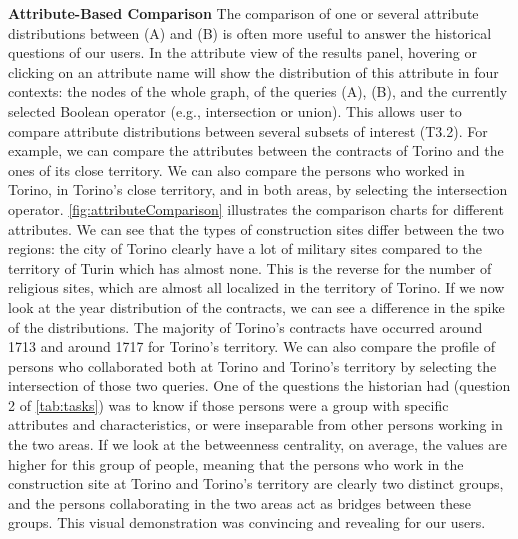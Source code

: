 \iffalse
\begin{figure}
    \centering
    \texttt{[image: Figures/comparisonPlots/graphMeasuresComparison.png]}
    \caption{Comparison table of the graph measures of the query filters (A) and (B)}\label{fig:comparisonTable}
\end{figure}
\fi

\noindent\textbf{Attribute-Based Comparison}
The comparison of one or several attribute distributions between (A) and (B) is often more useful to answer the historical questions of our users. In the attribute view of the results panel, hovering or clicking on an attribute name will show the distribution of this attribute in four contexts: the nodes of the whole graph, of the queries (A), (B), and the currently selected Boolean operator (e.g., intersection or union). This allows user to compare attribute distributions between several subsets of interest (T3.2). For example, we can compare the attributes between the contracts of Torino and the ones of its close territory. We can also compare the persons who worked in Torino, in Torino's close territory, and in both areas, by selecting the intersection operator.
\autoref{fig:attributeComparison} illustrates the comparison charts for different attributes.  We can see that the types of construction sites differ between the two regions: the city of Torino clearly have a lot of military sites compared to the territory of Turin which has almost none. This is the reverse for the number of religious sites, which are almost all localized in the territory of Torino. If we now look at the year distribution of the contracts, we can see a difference in the spike of the distributions. The majority of Torino's contracts have occurred around 1713 and around 1717 for Torino's territory.
We can also compare the profile of persons who collaborated both at Torino and Torino's territory by selecting the intersection of those two queries. One of the questions the historian had (question 2 of \autoref{tab:tasks}) was to know if those persons were a group with specific attributes and characteristics, or were inseparable from other persons working in the two areas. If we look at the betweenness centrality, on average, the values are higher for this group of people, meaning that the persons who work in the construction site at Torino and Torino's territory are clearly two distinct groups, and the persons collaborating in the two areas act as bridges between these groups.
This visual demonstration was convincing and revealing for our users.

